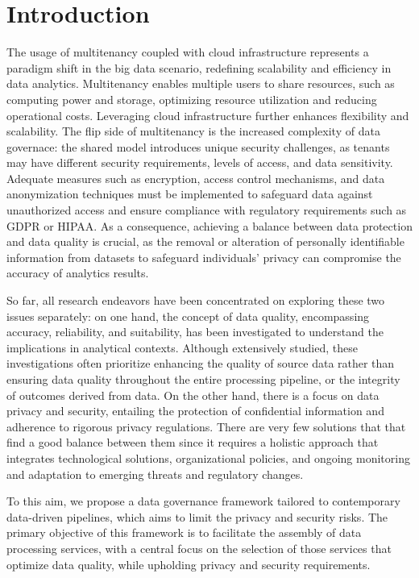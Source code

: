 \section{Introduction}
The usage of multitenancy coupled with cloud infrastructure represents a paradigm shift in the big data scenario, redefining scalability and efficiency in data analytics. Multitenancy enables multiple users to share resources, such as computing power and storage, optimizing resource utilization and reducing operational costs. Leveraging cloud infrastructure further enhances flexibility and scalability. 
%
The flip side of multitenancy is the increased complexity of data governace: the shared model introduces unique security challenges, as tenants may have different security requirements, levels of access, and data sensitivity. Adequate measures such as encryption, access control mechanisms, and data anonymization techniques must be implemented to safeguard data against unauthorized access and ensure compliance with regulatory requirements such as GDPR or HIPAA. 
%
As a consequence, achieving a balance between data protection and data quality is crucial, as the removal or alteration of personally identifiable information from datasets to safeguard individuals' privacy can compromise the accuracy of analytics results.

So far, all research endeavors have been concentrated on exploring these two issues separately: on one hand, the concept of data quality, encompassing accuracy, reliability, and suitability, has been investigated to understand the implications in analytical contexts. Although extensively studied, these investigations often prioritize enhancing the quality of source data rather than ensuring data quality throughout the entire processing pipeline, or the integrity of outcomes derived from data. On the other hand, there is a focus on data privacy and security, entailing the protection of confidential information and adherence to rigorous privacy regulations.
There are very few solutions that  that find a good balance between them since it requires a holistic approach that integrates technological solutions, organizational policies, and ongoing monitoring and adaptation to emerging threats and regulatory changes. 

To this aim, we propose a data governance framework tailored to contemporary data-driven pipelines, which aims to limit the privacy and security risks. The primary objective of this framework is to facilitate the assembly of data processing services, with a central focus on the selection of those services that optimize data quality, while upholding privacy and security requirements.

